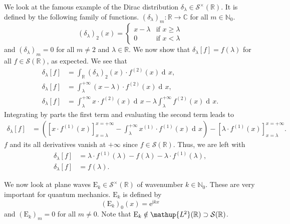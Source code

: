 \documentclass[12pt, a4 paper]{article}
\theoremstyle{definition}
\newcommand{\ltwo}{\mathup{L\kern-0.5pt^2}}
\newcommand{\rr}{\mathbb{R}}
\newcommand{\cc}{\mathbb{C}}
\newcommand{\nn}{\mathbb{N}_0}
\newcommand{\dirac}{\delta}
\newcommand{\ltwor}{\ltwo(\rr)}
\newcommand{\schwartz}{\mathcal{S}}
\newcommand{\schwartzr}{\schwartz(\rr)}
\newcommand{\dist}{\schwartz^\times}
\newcommand{\distr}{\dist(\rr)}
\renewcommand{\i}{\mathrm{i}}
\newcommand{\e}{\mathrm{e}}
\newcommand{\der}{\operatorname{d\!}{}}
\newcommand{\slantbox}[2][.5]
{%
	\mbox
	{%
		\sbox{\foobox}{#2}%
		\hskip\wd\foobox
		\pdfsave
		\pdfsetmatrix{1 0 #1 1}%
		\llap{\usebox{\foobox}}%
		\pdfrestore
	}%
}
\begin{document}
	We look at the famous example of the Dirac distribution $\dirac_\lambda \in \distr$. It is defined by the following family of functions. $(\dirac_\lambda)_m \colon \rr \rightarrow \cc$ for all $m \in \nn$.
	\[
	(\dirac_\lambda)_2 (x) =
	\begin{cases}
		x - \lambda & \text{if $x \geq \lambda$}\\
		0 & \text{if $x < \lambda$}
	\end{cases}
	\]
	and $(\dirac_\lambda)_m = 0$ for all $m \neq 2$ and $\lambda \in \rr$. We now show that $\dirac_\lambda[f] = f(\lambda)$ for all $f \in \schwartzr$, as expected. We see that
	\begin{align*}
		\dirac_\lambda [f] &= \int_{\rr} (\dirac_\lambda)_2 (x) \cdot f^{(2)} (x) \der x,\\
		\dirac_\lambda [f] &= \int_\lambda^{+\infty} (x - \lambda)\cdot f^{(2)} (x) \der x,\\
		\dirac_\lambda [f] &= \int_\lambda^{+\infty} x\cdot f^{(2)} (x) \der x - \lambda \int_\lambda^{+\infty} f^{(2)} (x) \der x.
	\end{align*}
	Integrating by parts the first term and evaluating the second term leads to
	\begin{align*}
		\dirac_\lambda [f] &= \left(\left[x \cdot f^{(1)}(x)\right]_{x = \lambda}^{x = +\infty} - \int_\lambda^{+\infty} x^{(1)}\cdot f^{(1)} (x) \der x\right) - \left[\lambda \cdot f^{(1)} (x)\right]_{x = \lambda}^{x = +\infty}.
	\end{align*}
	$f$ and its all derivatives vanish at $+\infty$ since $f \in \schwartzr$. Thus, we are left with
	\begin{align*}
		\dirac_\lambda [f] &= \lambda \cdot f^{(1)}(\lambda) - f(\lambda) - \lambda \cdot f^{(1)}(\lambda),\\
		\dirac_\lambda [f] &= f(\lambda).
	\end{align*}

	We now look at plane waves $\mathrm{E}_k \in \distr$ of wavenumber $k \in \nn$. These are very important for quantum mechanics. $\mathrm{E}_k$ is defined by \[(\mathrm{E}_k)_0 (x) = \e^{\i kx}\] and $(\mathrm{E}_k)_m = 0$ for all $m \neq 0$. Note that $\mathrm{E}_k \notin \ltwor \supset \schwartzr$.

\end{document}
